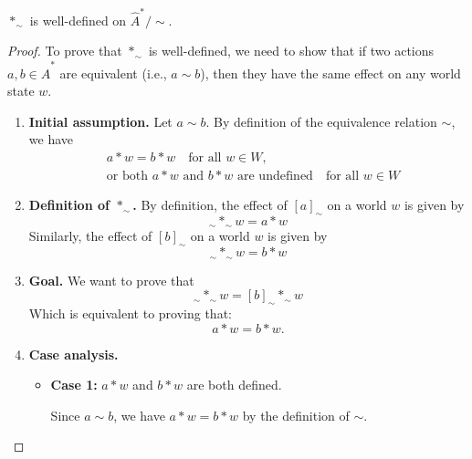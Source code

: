 \begin{proposition}
    $\ast_{\sim}$ is well-defined on $\hat{A}^{\ast}/\sim$.
\end{proposition}
\begin{proof}
    To prove that $\ast_{\sim}$ is well-defined, we need to show that if two actions $a, b \in \hat{A}^{\ast}$ are equivalent (i.e., $a \sim b$), then they have the same effect on any world state $w$.

    \begin{enumerate}[(1)]
        \item \textbf{Initial assumption.}
        Let $a \sim b$.
        By definition of the equivalence relation $\sim$, we have
        \begin{align}
            &a \ast w = b \ast w \quad \text{for all } w \in W, \\
            &\text{or both $a \ast w$ and $b \ast w$ are undefined} \quad \text{for all } w \in W
        \end{align}

        \item \textbf{Definition of $\ast_{\sim}$.}
        By definition, the effect of $[a]_{\sim}$ on a world $w$ is given by
        \begin{equation}
            [a]_{\sim} \ast_{\sim} w = a \ast w
        \end{equation}
        Similarly, the effect of $[b]_{\sim}$ on a world $w$ is given by
        \begin{equation}
            [b]_{\sim} \ast_{\sim} w = b \ast w
        \end{equation}

        \item \textbf{Goal.}
        We want to prove that
        \begin{equation}
            [a]_{\sim} \ast_{\sim} w = [b]_{\sim} \ast_{\sim} w
        \end{equation}
        Which is equivalent to proving that:
        \begin{equation}
            a \ast w = b \ast w.
        \end{equation}

        \item \textbf{Case analysis.}
        \begin{itemize}
            \item \textbf{Case 1:} $a \ast w$ and $b \ast w$ are both defined.

            Since $a \sim b$, we have $a \ast w = b \ast w$ by the definition of $\sim$.


\end{itemize}
\end{enumerate}
\end{proof}
